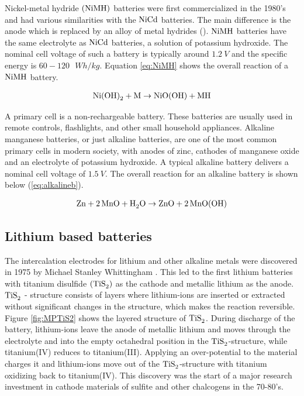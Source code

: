 Nickel-metal hydride $(\ce{NiMH})$  batteries were first commercialized in the 1980's and had various similarities with the $\ce{NiCd}$ batteries. The main difference is the anode which is replaced by an alloy of metal hydrides (). $\ce{NiMH}$ batteries have the same electrolyte as $\ce{NiCd}$ batteries, a solution of potassium hydroxide. The nominal cell voltage of such a battery is typically around $\SI{1.2}{V}$ and the specific energy is $60-120\text{ } \si{Wh/kg}$. Equation \ref{eq:NiMH} shows the overall reaction of a $\ce{NiMH}$ battery.

\begin{align}\label{eq:NiMH}
\ce{Ni(OH)_2} + \ce{M} \rightarrow \ce{NiO(OH)} + \ce{MH}
\end{align}

A primary cell is a non-rechargeable battery. These batteries are usually used in remote controls, flashlights, and other small household appliances. Alkaline manganese batteries, or just alkaline batteries, are one of the most common primary cells in modern society, with anodes of zinc, cathodes of manganese oxide and an electrolyte of potassium hydroxide. A typical alkaline battery delivers a nominal cell voltage of $\SI{1.5}{V}$. The overall reaction for an alkaline battery is shown below (\ref{eq:alkalineb}).

\begin{align}\label{eq:alkalineb}
\ce{Zn} + \ce{2MnO} +\ce{H_2O} \rightarrow \ce{ZnO} + \ce{2MnO(OH)}
\end{align}

\subsection{Lithium based batteries}

The intercalation electrodes for lithium and other alkaline metals were discovered in 1975 by Michael Stanley Whittingham \cite{whittingham1975lithium}. This led to the first lithium batteries with titanium disulfide $(\ce{TiS_2})$ as the cathode and metallic lithium as the anode. $\ce{TiS_2} $ - structure consists of layers where lithium-ions are inserted or extracted without significant changes in the structure, which makes the reaction reversible. Figure \ref{fig:MPTiS2} shows the layered structure of $\ce{TiS_2}$. During discharge of the battery, lithium-ions leave the anode of metallic lithium and moves through the electrolyte and into the empty octahedral position in the $\ce{TiS_2}$-structure, while titanium(IV) reduces to titanium(III). Applying an over-potential to the material charges it and lithium-ions move out of the $\ce{TiS_2}$-structure with titanium oxidizing back to titanium(IV). This discovery was the start of a major research investment in cathode materials of sulfite and other chalcogens in the 70-80's. 


